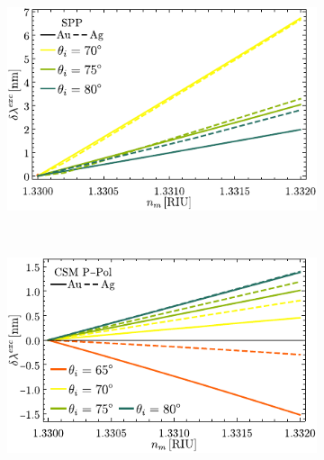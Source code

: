 \begin{figure}[h!]\centering
\begin{subfigure}{.01\linewidth}\caption{}\label{sfig:FoMSPP}\vspace{4.5cm}\end{subfigure}
	\begin{subfigure}{.45\linewidth}\hspace*{-.5em}
	\includegraphics[scale=1]{2-Resultados/figs/11-SPPCSM/4_Sens_h20-SPP.pdf}\end{subfigure}\\
\hspace*{-1.5em}
	\begin{subfigure}{.01\linewidth}\caption{}\label{sfig:FoMCSMp}\vspace{4.5cm}\end{subfigure}
	\begin{subfigure}{.45\linewidth}\hspace*{-.75em}
	\includegraphics[scale=1]{2-Resultados/figs/11-SPPCSM/5_Sens_h20_CSMP.pdf}\end{subfigure}
	\begin{subfigure}{.01\linewidth}\caption{}\label{sfig:FoMCSMs}\vspace{4.5cm}\end{subfigure}\hspace*{-.75em}

\end{figure}

